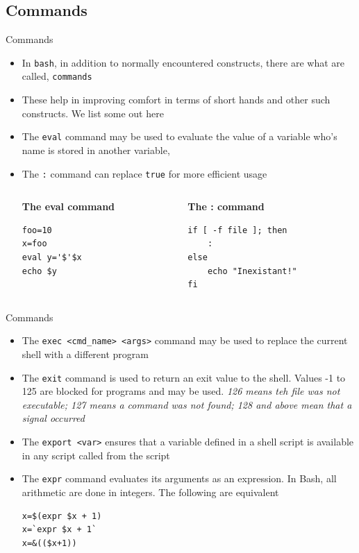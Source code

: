 \documentclass{beamer}
\begin{document}
\subsection{Commands}
\begin{frame}[fragile]{Commands}
  \begin{itemize}
  \item In \verb|bash|, in addition to normally encountered
    constructs, there are what are called, \verb|commands|
  \item These help in improving comfort in terms of short hands and
    other such constructs. We list some out here
  \item The \verb|eval| command may be used to evaluate the value of
    a variable who's name is stored in another variable,
  \item The \verb|:| command can replace \verb|true| for more
    efficient usage
    \begin{columns}
      \begin{column}{0.3\textwidth}
        {\centering \textbf{The eval command}}
\begin{verbatim}
foo=10
x=foo
eval y='$'$x
echo $y
\end{verbatim}
      \end{column}
      
      \begin{column}{0.4\textwidth}
        {\centering \textbf{The : command}}
\begin{verbatim}
if [ -f file ]; then
    :
else
    echo "Inexistant!"
fi
\end{verbatim}        
      \end{column}
    \end{columns}
  \end{itemize}
\end{frame}

\begin{frame}[fragile]{Commands}
  \begin{itemize}
  \item The \verb|exec <cmd_name> <args>| command may be used to
    replace the current shell with a different program
  \item The \verb|exit| command is used to return an exit value to the
    shell. Values -1 to 125 are blocked for programs and may be
    used. \emph{126 means teh file was not executable; 127 means a
      command was not found; 128 and above mean that a signal
      occurred}
  \item The \verb|export <var>| ensures that a variable defined in a
    shell script is available in any script called from the script
  \item The \verb|expr| command evaluates its arguments as an
    expression. In Bash, all arithmetic are done in integers. The
    following are equivalent
\begin{verbatim}
x=$(expr $x + 1)
x=`expr $x + 1`
x=&(($x+1))
\end{verbatim}
  \end{itemize}
\end{frame}
\end{document}
